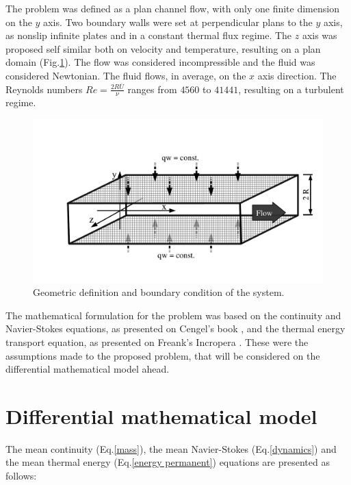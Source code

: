 \documentclass[10pt]{article} %
\begin{document}
The problem was defined as a plan channel flow, with only one finite dimension on the $y$ axis. Two boundary walls were set at perpendicular plans to the $y$ axis, as nonslip infinite plates and in a constant thermal flux regime. The $z$ axis was proposed self similar both on velocity and temperature, resulting on a plan domain (Fig.\ref{figure.1}). The flow was considered incompressible and the fluid was considered Newtonian. The fluid flows, in average, on the $x$ axis direction. 
The Reynolds numbers $Re = \frac{2R \overline{U}}{\nu}$ ranges from $4560$ to $41441$, resulting on a turbulent regime. 

\begin{figure}[h!]
	\centering
	\includegraphics[angle=0, trim={0mm 23mm 0mm 35mm}, clip , scale=0.42]{fotos_formatacao_final/canal1}
	\caption{Geometric definition and boundary condition of the system.}
	\label{figure.1}
\end{figure}

The mathematical formulation for the problem was based on the continuity and Navier-Stokes equations, as presented on Cengel's book \cite{Cengel}, and the thermal energy transport equation, as presented on Freank's Incropera \cite{Incropera}. These were the assumptions made to the proposed problem, that will be considered on the differential mathematical model ahead.





\section{Differential mathematical model}

The mean continuity (Eq.\ref{mass}), the mean Navier-Stokes (Eq.\ref{dynamics}) and the mean thermal energy (Eq.\ref{energy permanent}) equations are presented as follows: 
\end{document}
